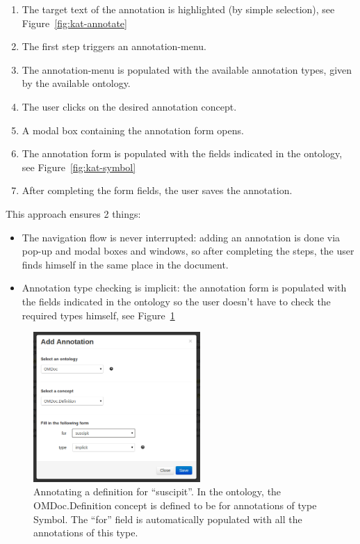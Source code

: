 \begin{enumerate}
\item The target text of the annotation is highlighted (by simple selection), see Figure~\ref{fig:kat-annotate}
\item The first step triggers an annotation-menu.
\item The annotation-menu is populated with the available annotation types, given by the
  available ontology.
\item The user clicks on the desired annotation concept.
\item A modal box containing the annotation form opens.
\item The annotation form is populated with the fields indicated in the ontology, see Figure~\ref{fig:kat-symbol}
\item After completing the form fields, the user saves the annotation.
\end{enumerate}
This approach ensures 2 things:
\begin{itemize}
\item The navigation flow is never interrupted: adding an annotation is done via pop-up
  and modal boxes and windows, so after completing the steps, the user finds himself in
  the same place in the document.
\item Annotation type checking is implicit: the annotation form is populated with the
  fields indicated in the ontology so the user doesn’t have to check the required types
  himself, see Figure~\ref{fig:kat-definition}
\end{itemize}

\begin{figure}[ht]\centering
 \includegraphics[width=2.5in]{figures/add-definition}
 \caption{Annotating a definition for ``suscipit''. In the ontology, the OMDoc.Definition
   concept is defined to be for annotations of type Symbol. The ``for'' field is
   automatically populated with all the annotations of this type.}\label{fig:kat-definition}
\end{figure}


